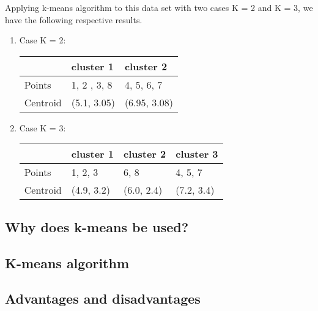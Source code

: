 \forceindent Applying k-means algorithm to this data set with two cases K = 2 and K = 3, we have the following respective results.
\begin{enumerate}[+)]
	\item Case K = 2:
	\begin{center}
		\begin{tabular}{ | l | l | l |}
			\hline
			 & cluster 1 & cluster 2 \\ \hline
			Points & 1, 2 , 3, 8 & 4, 5, 6, 7  \\ \hline
			Centroid & (5.1, 3.05) & (6.95, 3.08) \\ \hline
		\end{tabular}
	\end{center}
	\item Case K = 3:
	\begin{center}
		\begin{tabular}{ | l | l | l | l |}
			\hline
			& cluster 1 & cluster 2 & cluster 3 \\ \hline
			Points & 1, 2, 3 & 6, 8 & 4, 5, 7 \\ \hline
			Centroid & (4.9, 3.2) & (6.0, 2.4) & (7.2, 3.4) \\ \hline
		\end{tabular}
	\end{center}
		
\end{enumerate}
\subsection{Why does k-means be used?}


\subsection{K-means algorithm}

\subsection{Advantages and disadvantages}

